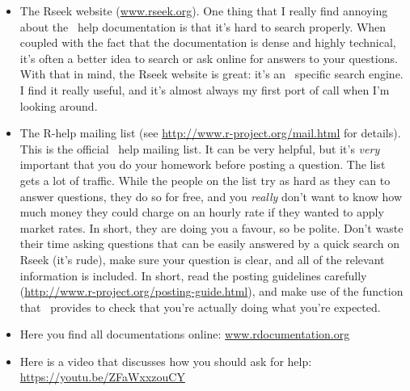 \begin{itemize}
	\item The Rseek website (\url{www.rseek.org}). One thing that I really find annoying about the \R\ help documentation is that it's hard to search properly. When coupled with the fact that the documentation is dense and highly technical, it's often a better idea to search or ask online for answers to your questions. With that in mind, the Rseek website is great: it's an \R\ specific search engine. I find it really useful, and it's almost always my first port of call when I'm looking around.
	\item The R-help mailing list (see \url{http://www.r-project.org/mail.html} for details). This is the official \R\ help mailing list. It can be very helpful, but it's {\it very} important that you do your homework before posting a question. The list gets a lot of traffic. While the people on the list try as hard as they can to answer questions, they do so for free, and you {\it really} don't want to know how much money they could charge on an hourly rate if they wanted to apply market rates. In short, they are doing you a favour, so be polite. Don't waste their time asking questions that can be easily answered by a quick search on Rseek (it's rude), make sure your question is clear, and all of the relevant information is included. In short, read the posting guidelines carefully (\url{http://www.r-project.org/posting-guide.html}), and make use of the  function that \R\ provides to check that you're actually doing what you're expected.
	\item Here you find all documentations online: \websmall\url{www.rdocumentation.org}
	\item Here is a video that discusses how you should ask for help: \websmall\url{https://youtu.be/ZFaWxxzouCY}
\end{itemize}


